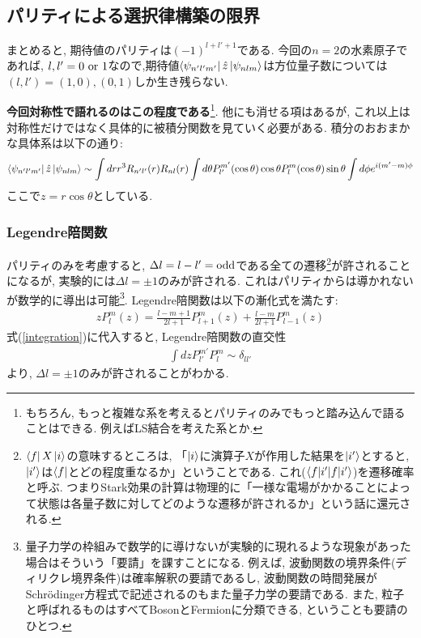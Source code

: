 \documentclass[10.5pt,a4paper]{jreport}
\begin{document}
\subsection{パリティによる選択律構築の限界}
まとめると, 期待値のパリティは$(-1)^{l+l'+1}$である. 今回の$n=2$の水素原子であれば, $l, l' = 0\ {\rm or}\ 1$なので,期待値$\bra{\psi_{n'l'm'}}\hat{z}\ket{\psi_{nlm}}$は方位量子数については$(l, l')= (1, 0), (0, 1)$しか生き残らない.

\textbf{今回対称性で語れるのはこの程度である}\footnote{もちろん, もっと複雑な系を考えるとパリティのみでもっと踏み込んで語ることはできる. 例えばLS結合を考えた系とか.}. 他にも消せる項はあるが, これ以上は対称性だけではなく具体的に被積分関数を見ていく必要がある. 積分のおおまかな具体系は以下の通り:
\begin{eqnarray}
  \nonumber  \bra{\psi_{n'l'm'}}\hat{z}\ket{\psi_{nlm}} \sim \int dr r^3R_{n'l'}(r)R_{nl}(r)\int d\theta P_{l'}^{m'}(\cos{\theta})\cos{\theta}P_l^m(\cos{\theta})\sin{\theta}\int d\phi e^{i(m'-m)\phi}\\
  \label{integration}
\end{eqnarray}
ここで$z = r\cos{\theta}$としている.
\subsubsection{Legendre陪関数}
パリティのみを考慮すると, $\Delta l = l - l' = {\rm odd}$である全ての遷移\footnote{$\bra{f}X\ket{i}$の意味するところは, 「$\ket{i}$に演算子$X$が作用した結果を$\ket{i'}$とすると, $\ket{i'}$は$\bra{f}$とどの程度重なるか」ということである. これ($\braket{f|i'}$)を遷移確率と呼ぶ. つまりStark効果の計算は物理的に「一様な電場がかかることによって状態は各量子数に対してどのような遷移が許されるか」という話に還元される.}が許されることになるが, 実験的には$\Delta l = \pm 1$のみが許される. これはパリティからは導かれないが数学的に導出は可能\footnote{量子力学の枠組みで数学的に導けないが実験的に現れるような現象があった場合はそういう「要請」を課すことになる. 例えば, 波動関数の境界条件(ディリクレ境界条件)は確率解釈の要請であるし, 波動関数の時間発展がSchr\"odinger方程式で記述されるのもまた量子力学の要請である. また, 粒子と呼ばれるものはすべてBosonとFermionに分類できる, ということも要請のひとつ.}. Legendre陪関数は以下の漸化式を満たす:
\begin{eqnarray}
zP_l^m(z) = \frac{l-m+1}{2l+1}P_{l+1}^m(z) + \frac{l-m}{2l+1}P_{l-1}^{m}(z)
\end{eqnarray}
式(\ref{integration})に代入すると, Legendre陪関数の直交性
\begin{eqnarray}
  \int dzP_{l'}^{m'}P_l^m \sim \delta_{ll'}
\end{eqnarray}
より, $\Delta l = \pm 1$のみが許されることがわかる.
\end{document}
